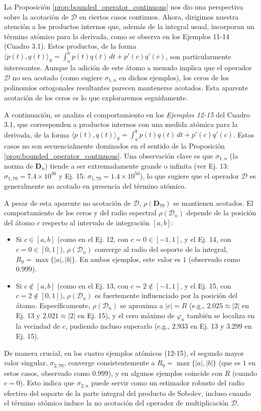 La Proposición \ref{prop:bounded_operator_continuous} nos dio una perspectiva sobre la acotación de $\mathcal{D}$ en ciertos casos continuos. Ahora, dirigimos nuestra atención a los productos internos que, además de la integral usual, incorporan un término atómico para la derivada, como se observa en los Ejemplos 11-14 (Cuadro 3.1). Estos productos, de la forma $\langle p(t),q(t) \rangle_S = \int_{a}^{b} p(t) q(t) \, dt + p'(c)q'(c)$, son particularmente interesantes. Aunque la adición de este átomo a menudo implica que el operador $\mathcal{D}$ no sea acotado (como sugiere $\sigma_{1,n}$ en dichos ejemplos), los ceros de los polinomios ortogonales resultantes parecen mantenerse acotados. Esta aparente acotación de los ceros es lo que exploraremos seguidamente.

A continuación, se analiza el comportamiento en los \textit{Ejemplos 12-15} del Cuadro 3.1, que corresponden a productos internos con una medida atómica para la derivada, de la forma $\langle p(t),q(t) \rangle_S = \int_{a}^{b} p(t) q(t) \, dt + p'(c)q'(c)$. Estos casos no son secuencialmente dominados en el sentido de la Proposición \ref{prop:bounded_operator_continuous}. Una observación clave es que $\sigma_{1,n}$ (la norma de $\mathbf{D}_n$) tiende a ser extremadamente grande o infinita (ver Ej. 13: $\sigma_{1,70} = 7.4 \times 10^{36}$ y Ej. 15: $\sigma_{1,70} = 1.4 \times 10^{50}$), lo que sugiere que el operador $\mathcal{D}$ es generalmente no acotado en presencia del término atómico.

A pesar de esta aparente no acotación de $\mathcal{D}$, $\rho(\mathbf{D}_{70})$ se mantienen acotados. El comportamiento de los ceros y del radio espectral $\rho(\mathcal{D}_n)$ depende de la posición del átomo $c$ respecto al intervalo de integración $[a,b]$:
\begin{itemize}
  \item Si $c \in [a,b]$ (como en el Ej. 12, con $c=0 \in [-1,1]$, y el Ej. 14, con $c=0 \in [0,1]$), $\rho(\mathcal{D}_n)$ converge al radio del soporte de la integral, $R_0 = \max\{|a|,|b|\}$. En ambos ejemplos, este valor es $1$ (observado como $0.999$).
  \item Si $c \notin [a,b]$ (como en el Ej. 13, con $c=2 \notin [-1,1]$, y el Ej. 15, con $c=2 \notin [0,1]$), $\rho(\mathcal{D}_n)$ es fuertemente influenciado por la posición del átomo. Específicamente, $\rho(\mathcal{D}_n)$ se aproxima a $|c|=R$ (e.g., $2.025 \approx |2|$ en Ej. 13 y $2.021 \approx |2|$ en Ej. 15), y el cero máximo de $\varphi_n$ también se localiza en la vecindad de $c$, pudiendo incluso superarlo (e.g., $2.933$ en Ej. 13 y $3.299$ en Ej. 15).
\end{itemize}
De manera crucial, en los cuatro ejemplos atómicos (12-15), el segundo mayor valor singular, $\sigma_{2,70}$, converge consistentemente a $R_0 = \max\{|a|,|b|\}$ (que es $1$ en estos casos, observado como $0.999$), y en algunos ejemplos coincide con $R$ (cuando $c=0$). Esto indica que $\sigma_{2,n}$ puede servir como un estimador robusto del radio efectivo del soporte de la parte integral del producto de Sobolev, incluso cuando el término atómico induce la no acotación del operador de multiplicación $\mathcal{D}$.

